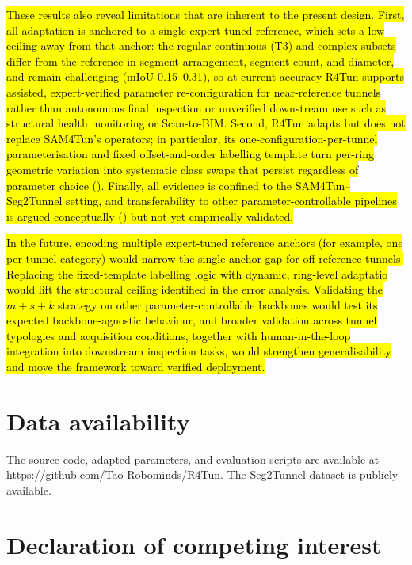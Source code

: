 \documentclass[a4paper,fleqn]{cas-dc}
\begin{document}
{\hl{These results also reveal limitations that are inherent to the present design. First, all adaptation is anchored to a single expert-tuned reference, which sets a low ceiling away from that anchor: the regular-continuous (T3) and complex subsets differ from the reference in segment arrangement, segment count, and diameter, and remain challenging (mIoU 0.15--0.31), so at current accuracy R4Tun supports assisted, expert-verified parameter re-configuration for near-reference tunnels rather than autonomous final inspection or unverified downstream use such as structural health monitoring or Scan-to-BIM. Second, R4Tun adapts but does not replace SAM4Tun's operators; in particular, its one-configuration-per-tunnel parameterisation and fixed offset-and-order labelling template turn per-ring geometric variation into systematic class swaps that persist regardless of parameter choice (). Finally, all evidence is confined to the SAM4Tun--Seg2Tunnel setting, and transferability to other parameter-controllable pipelines is argued conceptually () but not yet empirically validated.}

\hl{In the future, encoding multiple expert-tuned reference anchors (for example, one per tunnel category) would narrow the single-anchor gap for off-reference tunnels. Replacing the fixed-template labelling logic with dynamic, ring-level adaptatio would lift the structural ceiling identified in the error analysis. Validating the \mbox{$m+s+k$} strategy on other parameter-controllable backbones would test its expected backbone-agnostic behaviour, and broader validation across tunnel typologies and acquisition conditions, together with human-in-the-loop integration into downstream inspection tasks, would strengthen generalisability and move the framework toward verified deployment.}


\section*{Data availability}

The source code, adapted parameters, and evaluation scripts are available at \url{https://github.com/Tao-Robominds/R4Tun}. The Seg2Tunnel dataset is publicly available.

\section*{Declaration of competing interest}

}
\end{document}
